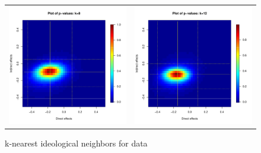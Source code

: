 \documentclass[12pt]{article}
\begin{document}
\begin{figure}
\begin{tabular}{cc}
	\includegraphics[scale=0.45]{./images/pval_plot_coppock_ideo_8nn.pdf} &
	\includegraphics[scale=0.45]{./images/pval_plot_coppock_ideo_12nn.pdf} \\ 
	\end{tabular}
	\caption{k-nearest ideological neighbors for \citet{butler2011can} data}
\end{figure}
\end{document}
